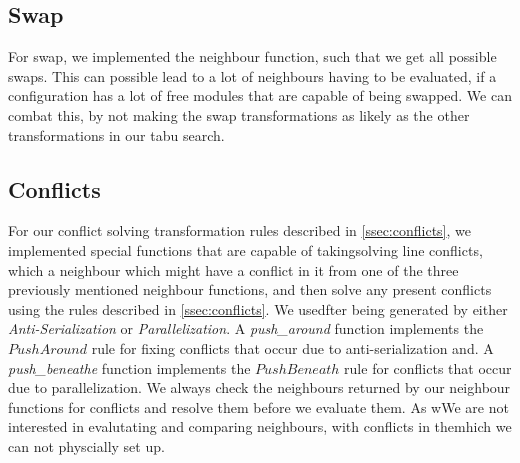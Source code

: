 \subsection{Swap}
For swap, we implemented the neighbour function, such that we get all possible swaps. This can possible lead to a lot of neighbours having to be evaluated, if a configuration has a lot of free modules that are capable of being swapped. We can combat this, by not making the swap transformations as likely as the other transformations in our tabu search.


\subsection{Conflicts} 
For our conflict solving transformation rules described in \cref{ssec:conflicts}, we implemented special functions that are capable of takingsolving line conflicts, which a neighbour which might have a conflict in it from one of the three previously mentioned neighbour functions, and then solve any present conflicts using the rules described in \cref{ssec:conflicts}. We usedfter being generated by either \textit{Anti-Serialization} or \textit{Parallelization}. A \textit{push\_around} function implements the $Push Around$ rule for fixing conflicts that occur due to anti-serialization and. A \textit{push\_beneathe} function implements the  $Push Beneath$ rule for conflicts that occur due to parallelization.
 We always check the neighbours returned by our neighbour functions for conflicts and resolve them before we evaluate them. As wWe are not interested in evalutating and comparing neighbours, with conflicts in themhich we can not physcially set up.

